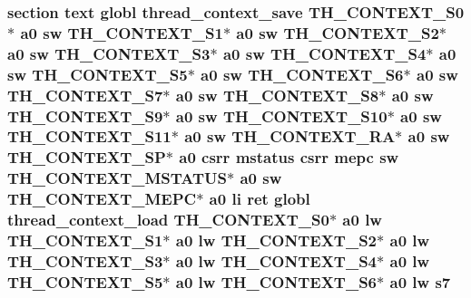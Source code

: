 \hypertarget{riscv_2threada_8S_ad094210757f1049dede17f857bd51274}{
\subsubsection[{s7}]{\setlength{\rightskip}{0pt plus 5cm}section text globl {\bf thread\-\_\-context\-\_\-save} {\bf T\-H\-\_\-\-C\-O\-N\-T\-E\-X\-T\-\_\-\-S0}$\ast$ {\bf a0} {\bf sw} {\bf T\-H\-\_\-\-C\-O\-N\-T\-E\-X\-T\-\_\-\-S1}$\ast$ {\bf a0} {\bf sw} {\bf T\-H\-\_\-\-C\-O\-N\-T\-E\-X\-T\-\_\-\-S2}$\ast$ {\bf a0} {\bf sw} {\bf T\-H\-\_\-\-C\-O\-N\-T\-E\-X\-T\-\_\-\-S3}$\ast$ {\bf a0} {\bf sw} {\bf T\-H\-\_\-\-C\-O\-N\-T\-E\-X\-T\-\_\-\-S4}$\ast$ {\bf a0} {\bf sw} {\bf T\-H\-\_\-\-C\-O\-N\-T\-E\-X\-T\-\_\-\-S5}$\ast$ {\bf a0} {\bf sw} {\bf T\-H\-\_\-\-C\-O\-N\-T\-E\-X\-T\-\_\-\-S6}$\ast$ {\bf a0} {\bf sw} {\bf T\-H\-\_\-\-C\-O\-N\-T\-E\-X\-T\-\_\-\-S7}$\ast$ {\bf a0} {\bf sw} {\bf T\-H\-\_\-\-C\-O\-N\-T\-E\-X\-T\-\_\-\-S8}$\ast$ {\bf a0} {\bf sw} {\bf T\-H\-\_\-\-C\-O\-N\-T\-E\-X\-T\-\_\-\-S9}$\ast$ {\bf a0} {\bf sw} {\bf T\-H\-\_\-\-C\-O\-N\-T\-E\-X\-T\-\_\-\-S10}$\ast$ {\bf a0} {\bf sw} {\bf T\-H\-\_\-\-C\-O\-N\-T\-E\-X\-T\-\_\-\-S11}$\ast$ {\bf a0} {\bf sw} {\bf T\-H\-\_\-\-C\-O\-N\-T\-E\-X\-T\-\_\-\-R\-A}$\ast$ {\bf a0} {\bf sw} {\bf T\-H\-\_\-\-C\-O\-N\-T\-E\-X\-T\-\_\-\-S\-P}$\ast$ {\bf a0} csrr {\bf mstatus} csrr {\bf mepc} {\bf sw} {\bf T\-H\-\_\-\-C\-O\-N\-T\-E\-X\-T\-\_\-\-M\-S\-T\-A\-T\-U\-S}$\ast$ {\bf a0} {\bf sw} {\bf T\-H\-\_\-\-C\-O\-N\-T\-E\-X\-T\-\_\-\-M\-E\-P\-C}$\ast$ {\bf a0} {\bf li} ret globl {\bf thread\-\_\-context\-\_\-load} {\bf T\-H\-\_\-\-C\-O\-N\-T\-E\-X\-T\-\_\-\-S0}$\ast$ {\bf a0} {\bf lw} {\bf T\-H\-\_\-\-C\-O\-N\-T\-E\-X\-T\-\_\-\-S1}$\ast$ {\bf a0} {\bf lw} {\bf T\-H\-\_\-\-C\-O\-N\-T\-E\-X\-T\-\_\-\-S2}$\ast$ {\bf a0} {\bf lw} {\bf T\-H\-\_\-\-C\-O\-N\-T\-E\-X\-T\-\_\-\-S3}$\ast$ {\bf a0} {\bf lw} {\bf T\-H\-\_\-\-C\-O\-N\-T\-E\-X\-T\-\_\-\-S4}$\ast$ {\bf a0} {\bf lw} {\bf T\-H\-\_\-\-C\-O\-N\-T\-E\-X\-T\-\_\-\-S5}$\ast$ {\bf a0} {\bf lw} {\bf T\-H\-\_\-\-C\-O\-N\-T\-E\-X\-T\-\_\-\-S6}$\ast$ {\bf a0} {\bf lw} s7}}\label{riscv_2threada_8S_ad094210757f1049dede17f857bd51274}
